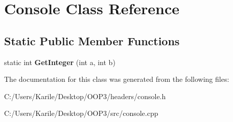 \hypertarget{class_console}{}\section{Console Class Reference}
\label{class_console}
\subsection*{Static Public Member Functions}
\begin{DoxyCompactItemize}
\item 
\mbox{\label{class_console_a15c0e73dc412ffdb97146a640b4f90db}} 
static int {\bfseries Get\+Integer} (int a, int b)
\end{DoxyCompactItemize}


The documentation for this class was generated from the following files\+:\begin{DoxyCompactItemize}
\item 
C\+:/\+Users/\+Karile/\+Desktop/\+O\+O\+P3/headers/console.\+h\item 
C\+:/\+Users/\+Karile/\+Desktop/\+O\+O\+P3/src/console.\+cpp\end{DoxyCompactItemize}
